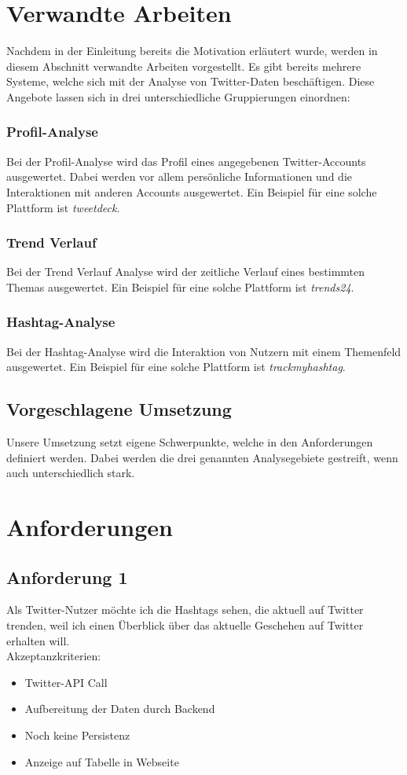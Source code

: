 \documentclass[conference]{IEEEtran}
\begin{document}
\section{Verwandte Arbeiten}
Nachdem in der Einleitung bereits die Motivation erläutert wurde, werden in diesem Abschnitt verwandte Arbeiten vorgestellt.
Es gibt bereits mehrere Systeme, welche sich mit der Analyse von Twitter-Daten beschäftigen.
Diese Angebote lassen sich in drei unterschiedliche Gruppierungen einordnen:
\subsubsection*{Profil-Analyse}
Bei der Profil-Analyse wird das Profil eines angegebenen Twitter-Accounts ausgewertet.
Dabei werden vor allem persönliche Informationen und die Interaktionen mit anderen Accounts ausgewertet.
Ein Beispiel für eine solche Plattform ist \textit{tweetdeck}\cite{tweetdeck}.
\subsubsection*{Trend Verlauf}
Bei der Trend Verlauf Analyse wird der zeitliche Verlauf eines bestimmten Themas ausgewertet. Ein Beispiel für eine solche Plattform ist \textit{trends24}\cite{trends24}.
\subsubsection*{Hashtag-Analyse}
Bei der Hashtag-Analyse wird die Interaktion von Nutzern mit einem Themenfeld ausgewertet.
Ein Beispiel für eine solche Plattform ist \textit{trackmyhashtag}\cite{trackmyhashtag}.
\subsection{Vorgeschlagene Umsetzung}
Unsere Umsetzung setzt eigene Schwerpunkte, welche in den Anforderungen definiert werden.
Dabei werden die drei genannten Analysegebiete gestreift, wenn auch unterschiedlich stark.
\section{Anforderungen}

\subsection{Anforderung 1}
Als Twitter-Nutzer möchte ich die Hashtags sehen, die aktuell auf Twitter trenden,
weil ich einen Überblick über das aktuelle Geschehen auf Twitter erhalten will.
\\
Akzeptanzkriterien:
\begin{itemize}
        \item Twitter-API Call
        \item Aufbereitung der Daten durch Backend
        \item Noch keine Persistenz
        \item Anzeige auf Tabelle in Webseite
\end{itemize}
\end{document}
